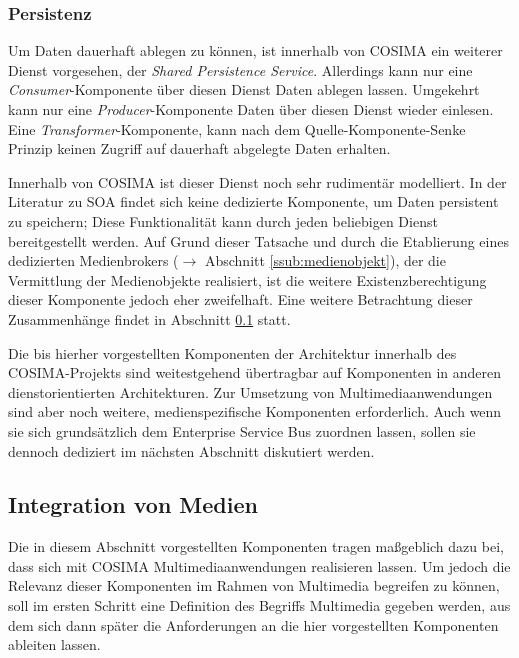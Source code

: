 
\subsubsection{Persistenz} %
\label{ssub:persistenz}

  Um Daten dauerhaft ablegen zu können, ist innerhalb von COSIMA ein weiterer Dienst vorgesehen, der \emph{Shared Persistence Service}. Allerdings kann nur eine \emph{Consumer}-Komponente über diesen Dienst Daten ablegen lassen. Umgekehrt kann nur eine \emph{Producer}-Komponente Daten über diesen Dienst wieder einlesen. Eine \emph{Transformer}-Komponente, kann nach dem Quelle-Komponente-Senke Prinzip keinen Zugriff auf dauerhaft abgelegte Daten erhalten.
  
  Innerhalb von COSIMA ist dieser Dienst noch sehr rudimentär modelliert. In der Literatur zu SOA findet sich keine dedizierte Komponente, um Daten persistent zu speichern; Diese Funktionalität kann durch jeden beliebigen Dienst bereitgestellt werden. Auf Grund dieser Tatsache und durch die Etablierung eines dedizierten Medienbrokers ($\to$ Abschnitt \ref{ssub:medienobjekt}), der die Vermittlung der Medienobjekte realisiert, ist die weitere Existenzberechtigung dieser Komponente jedoch eher zweifelhaft. Eine weitere Betrachtung dieser Zusammenhänge findet in Abschnitt \ref{sub:integration_von_medien} statt.
  

  Die bis hierher vorgestellten Komponenten der Architektur innerhalb des COSIMA-Projekts sind weitestgehend übertragbar auf Komponenten in anderen dienstorientierten Architekturen. Zur Umsetzung von Multimediaanwendungen sind aber noch weitere, medienspezifische Komponenten erforderlich. Auch wenn sie sich grundsätzlich dem Enterprise Service Bus zuordnen lassen, sollen sie dennoch dediziert im nächsten Abschnitt diskutiert werden.


\subsection{Integration von Medien} %
\label{sub:integration_von_medien}

  Die in diesem Abschnitt vorgestellten Komponenten tragen maßgeblich dazu bei, dass sich mit COSIMA Multimediaanwendungen realisieren lassen. Um jedoch die Relevanz dieser Komponenten im Rahmen von Multimedia begreifen zu können, soll im ersten Schritt eine Definition des Begriffs Multimedia gegeben werden, aus dem sich dann später die Anforderungen an die hier vorgestellten Komponenten ableiten lassen.
  
